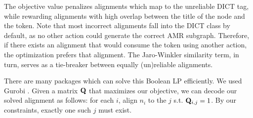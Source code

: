 The objective value penalizes alignments which map to the unreliable DICT tag,
  while rewarding alignments with high overlap between the title of the node and
  the token.
Note that most incorrect alignments fall into the DICT class by default, as no other
  action could generate the correct AMR subgraph.
Therefore, if there exists an alignment that would consume the token using another
  action, the optimization prefers that alignment.
The Jaro-Winkler similarity term, in turn, serves as a tie-breaker between equally
  (un)reliable alignments.

%
%
%
%
%

There are many packages which can solve this Boolean LP efficiently.
We used Gurobi \cite{gurobi}.
Given a matrix $\mathbf{Q}$ that maximizes our objective, we can decode our solved alignment 
  as follows: for each $i$, align $n_i$ to the $j$ s.t. $\mathbf{Q}_{i,j} = 1$. 
By our constraints, exactly one such $j$ must exist.
